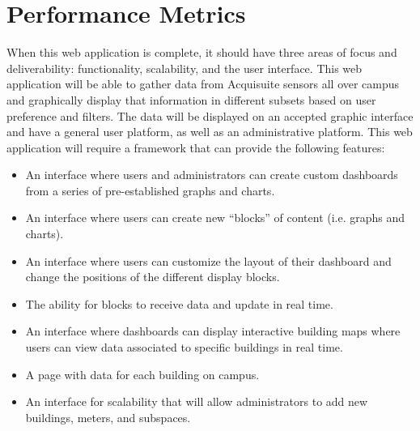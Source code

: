\documentclass[onecolumn, draftclsnofoot,10pt, compsoc]{IEEEtran}
\begin{document}
    \section{Performance Metrics}
    When this web application is complete, it should have three areas of focus and deliverability: functionality, scalability, and the user interface. This web application will be able to gather data from Acquisuite sensors all over campus and graphically display that information in different subsets based on user preference and filters. The data will be displayed on an accepted graphic interface and have a general user platform, as well as an administrative platform.
    This web application will require a framework that can provide the following features:
    \begin{itemize}
        \item An interface where users and administrators can create custom dashboards from a series of pre-established graphs and charts.
        \item An interface where users can create new “blocks” of content (i.e. graphs and charts).
        \item An interface where users can customize the layout of their dashboard and change the positions of the different display blocks.
        \item The ability for blocks to receive data and update in real time.
        \item An interface where dashboards can display interactive building maps where users can view data associated to specific buildings in real time.
        \item A page with data for each building on campus.
        \item An interface for scalability that will allow administrators to add new buildings, meters, and subspaces.
    \end{itemize}
    
    
    
\end{document}
